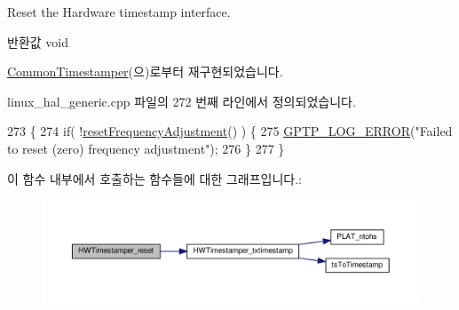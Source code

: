 Reset the Hardware timestamp interface. 

\begin{DoxyReturn}{반환값}
void 
\end{DoxyReturn}


\hyperlink{class_common_timestamper_a1ee6bfcaf63bef07bbed1306e52e7203}{Common\+Timestamper}(으)로부터 재구현되었습니다.



linux\+\_\+hal\+\_\+generic.\+cpp 파일의 272 번째 라인에서 정의되었습니다.


\begin{DoxyCode}
273 \{
274     \textcolor{keywordflow}{if}( !\hyperlink{class_linux_timestamper_generic_a0db03755529ffca07f6d4a46d26a60c8}{resetFrequencyAdjustment}() ) \{
275         \hyperlink{gptp__log_8hpp_afefbb1009717c128012bfeed94842987}{GPTP\_LOG\_ERROR}(\textcolor{stringliteral}{"Failed to reset (zero) frequency adjustment"});
276     \}
277 \}
\end{DoxyCode}


이 함수 내부에서 호출하는 함수들에 대한 그래프입니다.\+:
\nopagebreak
\begin{figure}[H]
\begin{center}
\leavevmode
\includegraphics[width=350pt]{class_linux_timestamper_generic_a4ad3a40de8c6141b2d26b9df5cc3cd97_cgraph}
\end{center}
\end{figure}


